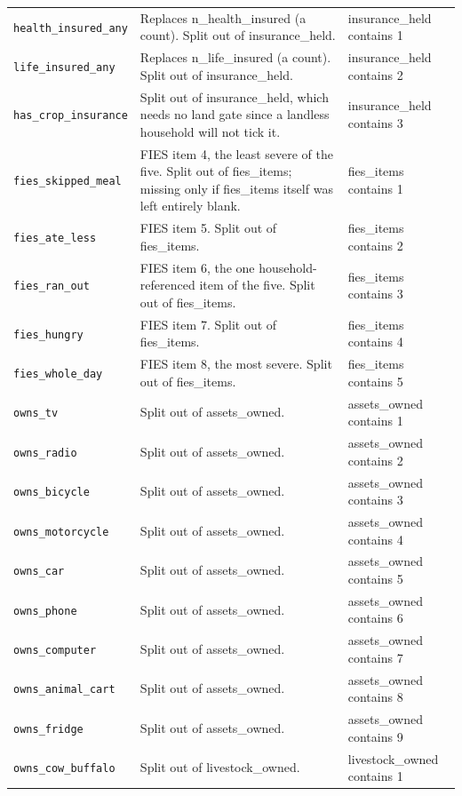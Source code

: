 \documentclass[10pt]{article}
\begin{document}
{\begin{longtable}{p{3.3cm}p{7.6cm}p{5.7cm}}
\texttt{health\_insured\_any} & Replaces n\_health\_insured (a count). Split out of insurance\_held. & insurance\_held contains 1 \\
\texttt{life\_insured\_any} & Replaces n\_life\_insured (a count). Split out of insurance\_held. & insurance\_held contains 2 \\
\texttt{has\_crop\_insurance} & Split out of insurance\_held, which needs no land gate since a landless household will not tick it. & insurance\_held contains 3 \\
\texttt{fies\_skipped\_meal} & FIES item 4, the least severe of the five. Split out of fies\_items; missing only if fies\_items itself was left entirely blank. & fies\_items contains 1 \\
\texttt{fies\_ate\_less} & FIES item 5. Split out of fies\_items. & fies\_items contains 2 \\
\texttt{fies\_ran\_out} & FIES item 6, the one household-referenced item of the five. Split out of fies\_items. & fies\_items contains 3 \\
\texttt{fies\_hungry} & FIES item 7. Split out of fies\_items. & fies\_items contains 4 \\
\texttt{fies\_whole\_day} & FIES item 8, the most severe. Split out of fies\_items. & fies\_items contains 5 \\
\texttt{owns\_tv} & Split out of assets\_owned. & assets\_owned contains 1 \\
\texttt{owns\_radio} & Split out of assets\_owned. & assets\_owned contains 2 \\
\texttt{owns\_bicycle} & Split out of assets\_owned. & assets\_owned contains 3 \\
\texttt{owns\_motorcycle} & Split out of assets\_owned. & assets\_owned contains 4 \\
\texttt{owns\_car} & Split out of assets\_owned. & assets\_owned contains 5 \\
\texttt{owns\_phone} & Split out of assets\_owned. & assets\_owned contains 6 \\
\texttt{owns\_computer} & Split out of assets\_owned. & assets\_owned contains 7 \\
\texttt{owns\_animal\_cart} & Split out of assets\_owned. & assets\_owned contains 8 \\
\texttt{owns\_fridge} & Split out of assets\_owned. & assets\_owned contains 9 \\
\texttt{owns\_cow\_buffalo} & Split out of livestock\_owned. & livestock\_owned contains 1 \\

\end{longtable}}
\end{document}
